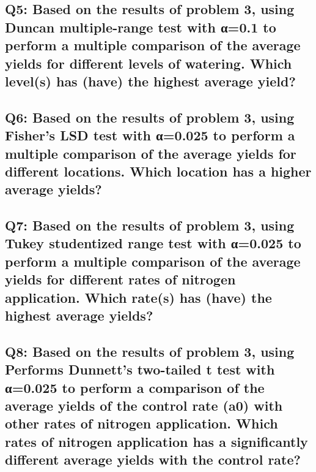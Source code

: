 \documentclass[a4paper,man,natbib]{apa6}
\begin{document}
\subsection*{Q5: Based on the results of problem 3, using Duncan multiple-range test with α=0.1 to perform a multiple comparison of the average yields for different levels of watering. Which level(s) has (have) the highest average yield? }
% 

\subsection*{Q6: Based on the results of problem 3, using Fisher’s LSD test with α=0.025 to perform a multiple comparison of the average yields for different locations. Which location has a higher average yields? }
% 

\subsection*{Q7: Based on the results of problem 3, using Tukey studentized range test with α=0.025 to perform a multiple comparison of the average yields for different rates of nitrogen application. Which rate(s) has (have) the highest average yields? }
% 

\subsection*{Q8: Based on the results of problem 3, using Performs Dunnett’s two-tailed t test with α=0.025 to perform a comparison of the average yields of the control rate (a0) with other rates of nitrogen application. Which rates of nitrogen application has a significantly different average yields with the control rate? }
% 
\end{document}
